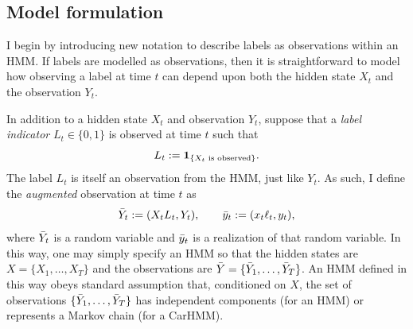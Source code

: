\subsection{Model formulation}

I begin by introducing new notation to describe labels as observations within an HMM. If labels are modelled as observations, then it is straightforward to model how observing a label at time $t$ can depend upon both the hidden state $X_t$ and the observation $Y_t$.

In addition to a hidden state $X_t$ and observation $Y_t$, suppose that a \textit{label indicator} $L_t \in \{0,1\}$ is observed at time $t$ such that 
%
\begin{equation*}
    L_t := \mathbf{1}_{\{X_t\text{ is observed}\}}.
\end{equation*}
%
The label $L_t$ is itself an observation from the HMM, just like $Y_t$. As such, I define the \textit{augmented} observation at time $t$ as
%
\begin{equation*}
    \bar{Y}_t := (X_t L_t, Y_t), \qquad
    \bar{y}_t := (x_t \ell_t, y_t),
\end{equation*}
%
where $\bar{Y}_t$ is a random variable and $\bar{y}_t$ is a realization of that random variable. In this way, one may simply specify an HMM so that the hidden states are $X = \{X_1,\ldots,X_T\}$ and the observations are $\bar{Y} = \{\bar{Y}_1,\ldots,\bar{Y}_T\}$. An HMM defined in this way obeys standard assumption that, conditioned on $X$, the set of observations $\{\bar{Y}_1,\ldots,\bar{Y}_T\}$ has independent components (for an HMM) or represents a Markov chain (for a CarHMM).


